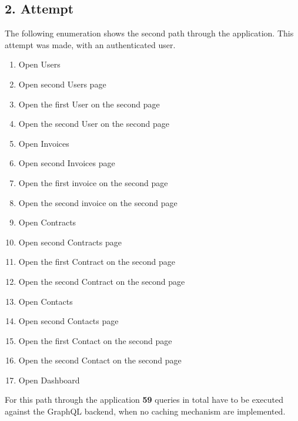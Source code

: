 \subsection{2. Attempt}

The following enumeration shows the second path through the application. This attempt was made, with an authenticated user.

\begin{enumerate}
  \item Open Users
  \item Open second Users page
  \item Open the first User on the second page
  \item Open the second User on the second page
  \item Open Invoices
  \item Open second Invoices page
  \item Open the first invoice on the second page
  \item Open the second invoice on the second page
  \item Open Contracts
  \item Open second Contracts page
  \item Open the first Contract on the second page
  \item Open the second Contract on the second page
  \item Open Contacts
  \item Open second Contacts page
  \item Open the first Contact on the second page
  \item Open the second Contact on the second page
  \item Open Dashboard
\end{enumerate}

For this path through the application \textbf{59} queries in total have to be executed against the
GraphQL backend, when no caching mechanism are implemented.

